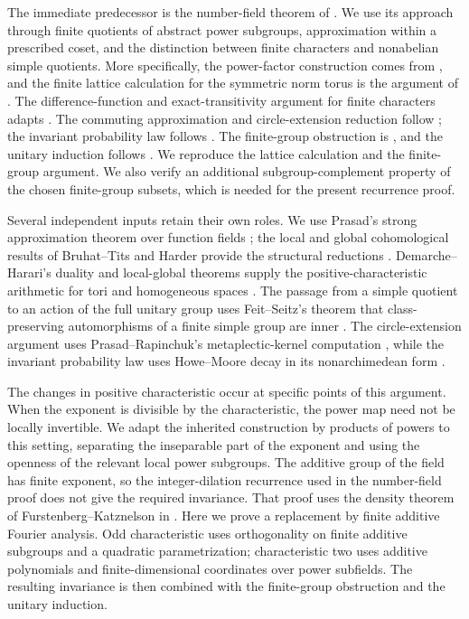The immediate predecessor is the number-field theorem of
\cite{MPNF}. We use its approach through finite quotients of abstract power
subgroups, approximation within a prescribed coset, and the distinction
between finite characters and nonabelian simple quotients. More
specifically, the power-factor construction comes from
\cite[Proposition~2.6]{MPNF}, and the finite lattice calculation for the
symmetric norm torus is the argument of
\cite[Lemmas~2.7--2.9]{MPNF}.
The difference-function and exact-transitivity argument for finite
characters adapts \cite[Section~4]{MPNF}.
The commuting approximation and circle-extension reduction follow
\cite[Section~3.1 and Sections~3.3--3.7]{MPNF}; the invariant probability
law follows \cite[Section~5.2]{MPNF}.
The finite-group obstruction is \cite[Lemma~5.2 and Section~6]{MPNF}, and
the unitary induction follows \cite[Section~7]{MPNF}.
We reproduce the lattice calculation and the finite-group argument. We
also verify an additional subgroup-complement property of the chosen
finite-group subsets, which is needed for the present recurrence proof.

Several independent inputs retain their own roles. We use Prasad's
strong approximation theorem over function fields \cite{PrasadSA}; the local and global
cohomological results of Bruhat--Tits and Harder provide the structural
reductions \cite{BruhatTitsIII,Harder}.
Demarche--Harari's duality and local-global theorems supply the
positive-characteristic arithmetic for tori and homogeneous spaces
\cite{DemarcheHarariDuality,DemarcheHarariHomogeneous}.
The passage from a simple quotient to an action of the full unitary group
uses Feit--Seitz's theorem that class-preserving automorphisms of a finite
simple group are inner \cite[Theorem~C]{FeitSeitz}.
The circle-extension argument uses Prasad--Rapinchuk's metaplectic-kernel
computation \cite{PRmetaplectic}, while the invariant probability law uses
Howe--Moore decay in its nonarchimedean form
\cite{HoweMoore}\cite[Theorem~4.19 and Definition~4.23]{Ciobotaru}.

The changes in positive characteristic occur at specific points of this
argument. When the exponent is divisible by the characteristic, the power
map need not be locally invertible. We adapt the inherited construction
by products of powers to this setting, separating the inseparable part
of the exponent and using the openness of the relevant local power
subgroups. The
additive group of the field has finite exponent, so the integer-dilation
recurrence used in the number-field proof does not give the required
invariance. That proof uses the density theorem of
Furstenberg--Katznelson \cite[Theorem~B]{FurstenbergKatznelson} in
\cite[Section~5.5]{MPNF}. Here we prove a replacement by finite additive
Fourier analysis. Odd characteristic uses orthogonality on finite additive
subgroups and a quadratic parametrization; characteristic two uses additive
polynomials and finite-dimensional coordinates over power subfields.
The resulting invariance is then combined with the finite-group
obstruction and the unitary induction.

